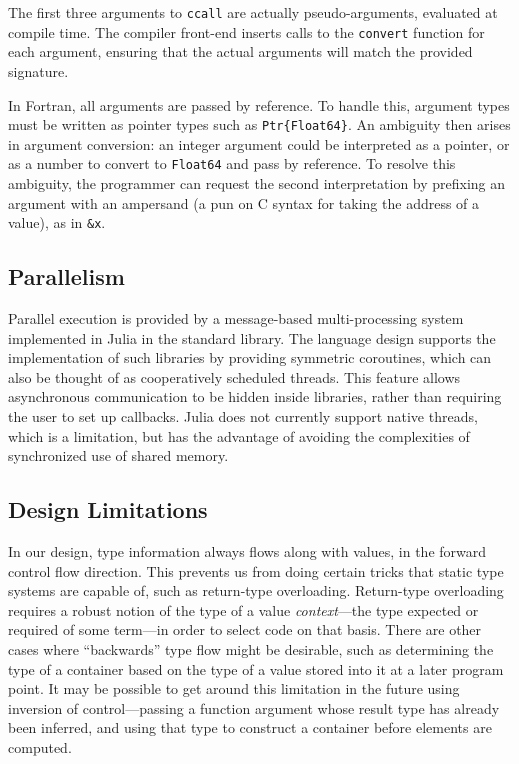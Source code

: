 \documentclass[9pt]{sigplanconf}
\begin{document}
The first three arguments to {\tt ccall} are actually pseudo-arguments,
evaluated at compile time. The compiler front-end inserts calls to the
{\tt convert} function for each argument, ensuring that the actual arguments
will match the provided signature.

In Fortran, all arguments are passed by reference. To handle this,
argument types must be written as pointer types such as
{\tt Ptr\{Float64\}}. An ambiguity then arises in argument conversion:
an integer argument could be interpreted as a pointer, or as a number
to convert to {\tt Float64} and pass by reference. To resolve this
ambiguity, the programmer can request the second interpretation by
prefixing an argument with an ampersand (a pun on C syntax for taking the
address of a value), as in {\tt \&x}.



\subsection{Parallelism}

Parallel execution is provided by a message-based multi-processing
system implemented in Julia in the standard library.
The language design supports the implementation of such libraries by
providing symmetric coroutines, which can also be thought of as
cooperatively scheduled threads. This feature allows asynchronous
communication to be hidden inside libraries, rather than requiring the
user to set up callbacks. Julia does not currently support
native threads, which is a limitation, but has the advantage of avoiding
the complexities of synchronized use of shared memory.


\subsection{Design Limitations}

In our design, type information always flows along with values, in the
forward control flow direction. This prevents us from doing certain tricks
that static type systems are capable of, such as return-type overloading.
Return-type overloading requires a robust notion of the type of a value
\emph{context}---the type expected or required of some term---in order to
select code on that basis. There are other cases where ``backwards'' type
flow might be desirable, such as determining the type of a container based
on the type of a value stored into it at a later program point. It may be
possible to get around this limitation in the future using inversion of
control---passing a function argument whose result type has already been
inferred, and using that type to construct a container before elements are
computed.
\end{document}

